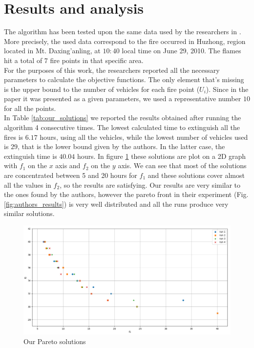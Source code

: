 \section{Results and analysis}
The algorithm has been tested upon the same data used by the researchers in \cite{fire_distinguish}. More precisely, the used data correspond to the fire occurred in Huzhong, region located in
Mt. Daxing’anling, at $10:40$ local time on June 29, 2010. The flames hit a total of 7 fire points in that specific area. \\
For the purposes of this work, the researchers reported all the necessary parameters to calculate the objective functions. The only element that's missing is the upper bound to the number
of vehicles for each fire point ($U_i$). Since in the paper it was presented as a given parameters, we used a representative number $10$ for all the points.\\
In Table \ref{tab:our_solutions} we reported the results obtained after running the algorithm 4 consecutive times. The lowest calculated time to extinguish all
the fires is $6.17$ hours, using all the vehicles, while the lowest number of vehicles used is $29$, that is the lower bound given by the authors. In the latter case, the extinguish
time is $40.04$ hours. In figure \ref{fig:pareto_results} these solutions are plot on a 2D graph with $f_1$ on the $x$ axis and $f_2$ on the $y$ axis. 
We can see that most of the solutions are concentrated between 5 and 20 hours for $f_1$ and these solutions cover almost all the values in $f_2$, so the results are satisfying. 
Our results are very similar to the ones found by the authors, however the pareto front in their experiment (Fig. \ref{fig:authors_results}) is very well distributed and 
all the runs produce very similar solutions.

\begin{figure}
    \includegraphics[width=\linewidth]{Images/our_results_4_runs.png}
    \caption{Our Pareto solutions}
    \label{fig:pareto_results}
\end{figure}

